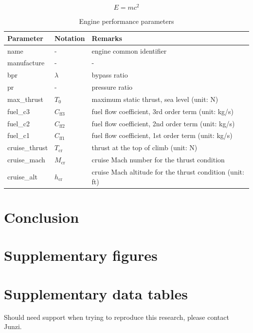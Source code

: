\documentclass[
  manuscript=article,  %
  year=20xx,
  volume=x,
]{joas}
\begin{document}
\blindtext

\begin{equation}
  E = m c^2
\end{equation}

\blindtext

\begin{table}[H]
  \centering
  \small
  \caption{Engine performance parameters}
  \label{tb:eng_perf_params}
  \begin{tabular}{lll}
  \toprule
  \textbf{Parameter} & \textbf{Notation} & \textbf{Remarks} \\
  \midrule
  name & - & engine common identifier \\
  manufacture & - & -  \\
  bpr & $\lambda$ & bypass ratio \\
  pr & - & pressure ratio \\
  max\_thrust & $T_0$ & maximum static thrust, sea level (unit: N) \\
  fuel\_c3 & $C_\mathrm{ff3}$ & fuel flow coefficient, 3rd order term (unit: kg/s) \\
  fuel\_c2 & $C_\mathrm{ff2}$ & fuel flow coefficient, 2nd order term (unit: kg/s) \\
  fuel\_c1 & $C_\mathrm{ff1}$ & fuel flow coefficient, 1st order term (unit: kg/s) \\
  cruise\_thrust & $T_\mathrm{cr}$ & thrust at the top of climb (unit: N) \\
  cruise\_mach & $M_\mathrm{cr}$ & cruise Mach number for the thrust condition \\
  cruise\_alt & $h_\mathrm{cr}$ & cruise Mach altitude for the thrust condition (unit: ft) \\
  \bottomrule
  \end{tabular}
\end{table}

\blindtext

\section{Conclusion}

\Blindtext


\begin{acknowledgement}
\blindtext
\end{acknowledgement}


\printbibliography

\appendix

\section{Supplementary figures}
\blindtext

\section{Supplementary data tables}
\blindtext

\begin{suppinfo}
Should need support when trying to reproduce this research, please contact Junzi.
\end{suppinfo}
\end{document}
